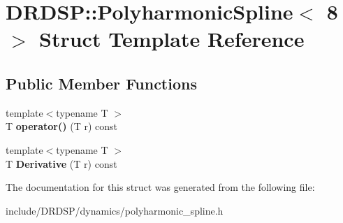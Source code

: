 \hypertarget{struct_d_r_d_s_p_1_1_polyharmonic_spline_3_018_01_4}{\section{D\-R\-D\-S\-P\-:\-:Polyharmonic\-Spline$<$ 8 $>$ Struct Template Reference}
\label{struct_d_r_d_s_p_1_1_polyharmonic_spline_3_018_01_4}
}
\subsection*{Public Member Functions}
\begin{DoxyCompactItemize}
\item 
\hypertarget{struct_d_r_d_s_p_1_1_polyharmonic_spline_3_018_01_4_a30a5d6bb3601f4c3a7b268f30475c5a4}{{\footnotesize template$<$typename T $>$ }\\T {\bfseries operator()} (T r) const }\label{struct_d_r_d_s_p_1_1_polyharmonic_spline_3_018_01_4_a30a5d6bb3601f4c3a7b268f30475c5a4}

\item 
\hypertarget{struct_d_r_d_s_p_1_1_polyharmonic_spline_3_018_01_4_a75a87b5ada7a25992948f19247dae95c}{{\footnotesize template$<$typename T $>$ }\\T {\bfseries Derivative} (T r) const }\label{struct_d_r_d_s_p_1_1_polyharmonic_spline_3_018_01_4_a75a87b5ada7a25992948f19247dae95c}

\end{DoxyCompactItemize}


The documentation for this struct was generated from the following file\-:\begin{DoxyCompactItemize}
\item 
include/\-D\-R\-D\-S\-P/dynamics/polyharmonic\-\_\-spline.\-h\end{DoxyCompactItemize}
